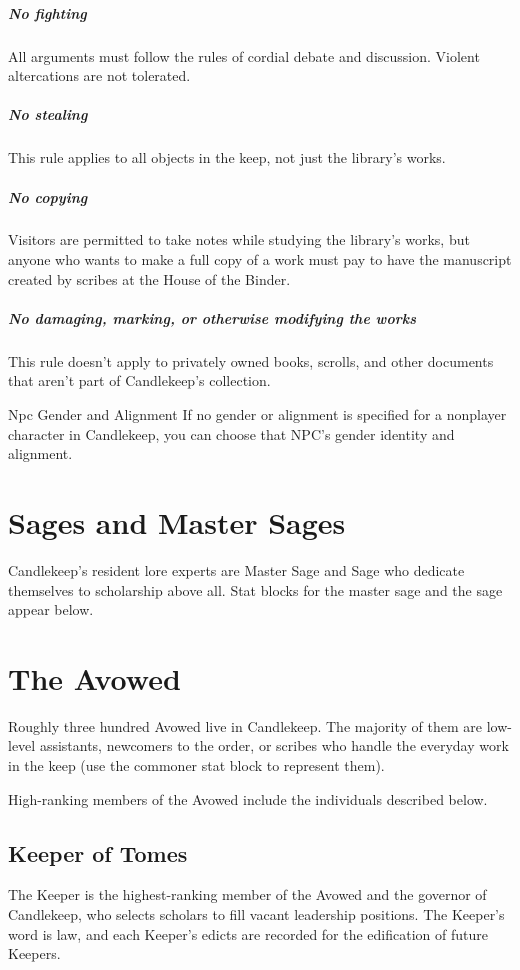 \documentclass[10pt,a4paper,twoside,bg=print,twocolumn,openany,nodeprecatedcode]{dndbook}
\begin{document}
\subparagraph{No fighting}
All arguments must follow the rules of cordial debate and discussion. Violent altercations are not tolerated.

\subparagraph{No stealing}
This rule applies to all objects in the keep, not just the library's works.

\subparagraph{No copying}
Visitors are permitted to take notes while studying the library's works, but anyone who wants to make a full copy of a work must pay to have the manuscript created by scribes at the House of the Binder.

\subparagraph{No damaging, marking, or otherwise modifying the works}
This rule doesn't apply to privately owned books, scrolls, and other documents that aren't part of Candlekeep's collection.

\begin{DndSidebar}[float=!b]{Npc Gender and Alignment}
If no gender or alignment is specified for a nonplayer character in Candlekeep, you can choose that NPC's gender identity and alignment.



\end{DndSidebar}

\section{Sages and Master Sages}
Candlekeep's resident lore experts are Master Sage and Sage who dedicate themselves to scholarship above all. Stat blocks for the master sage and the sage appear below.

\section{The Avowed}
Roughly three hundred Avowed live in Candlekeep. The majority of them are low-level assistants, newcomers to the order, or scribes who handle the everyday work in the keep (use the commoner stat block to represent them).

High-ranking members of the Avowed include the individuals described below.

\subsection{Keeper of Tomes}
The Keeper is the highest-ranking member of the Avowed and the governor of Candlekeep, who selects scholars to fill vacant leadership positions. The Keeper's word is law, and each Keeper's edicts are recorded for the edification of future Keepers.
\end{document}
